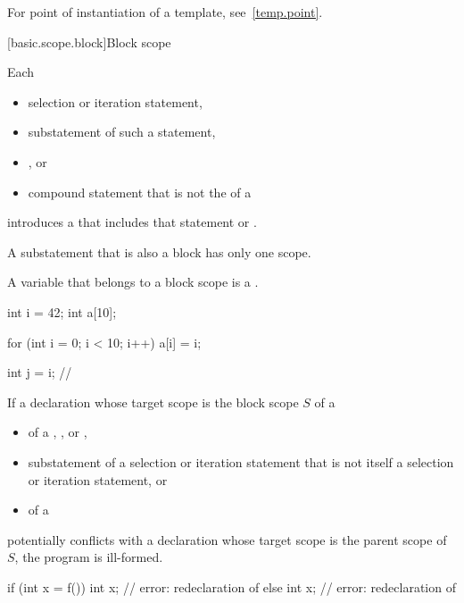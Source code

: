 \pnum
\begin{note}
For point of instantiation of a template, see~\ref{temp.point}.
\end{note}

[basic.scope.block]{Block scope}

%

\pnum
Each
\begin{itemize}
\item
selection or iteration statement,
\item
substatement of such a statement,
\item
{}%
, or
\item
compound statement
that is not the  of a 
\end{itemize}
introduces a 
that includes that statement or .
\begin{note}
A substatement that is also a block has only one scope.
\end{note}
A variable that belongs to a block scope is a .
\begin{example}
\begin{codeblock}
int i = 42;
int a[10];

for (int i = 0; i < 10; i++)
  a[i] = i;

int j = i;          // 
\end{codeblock}
\end{example}

\pnum
If a declaration whose target scope is the block scope $S$ of a
\begin{itemize}
\item
{} of a ,
, or ,
\item
substatement of a selection or iteration statement
that is not itself a selection or iteration statement, or
\item
{} of a 
\end{itemize}
potentially conflicts with a declaration
whose target scope is the parent scope of $S$,
the program is ill-formed.
\begin{example}
\begin{codeblock}
if (int x = f()) {
  int x;            // error: redeclaration of 
}
else {
  int x;            // error: redeclaration of 
}
\end{codeblock}
\end{example}

